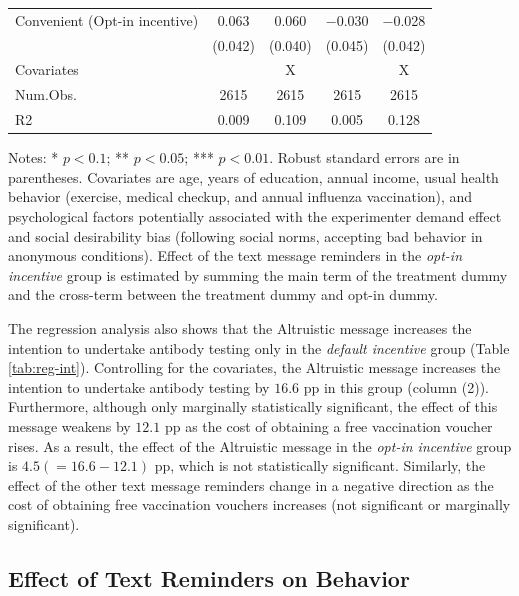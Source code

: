 \documentclass[
      12pt,
    a4paper
]{article}
\begin{document}
\begin{table}
\begin{threeparttable}
\begin{tabular}[t]{lcccc}
\hspace{1em}Convenient (Opt-in incentive) & \num{0.063} & \num{0.060} & \num{-0.030} & \num{-0.028}\\
\hspace{1em} & (\num{0.042}) & (\num{0.040}) & (\num{0.045}) & (\num{0.042})\\
\midrule
Covariates &  & X &  & X\\
Num.Obs. & \num{2615} & \num{2615} & \num{2615} & \num{2615}\\
R2 & \num{0.009} & \num{0.109} & \num{0.005} & \num{0.128}\\
\bottomrule
\end{tabular}
\begin{tablenotes}
\item Notes: * $p < 0.1$; ** $p < 0.05$; *** $p < 0.01$. Robust standard errors are in parentheses. Covariates are age, years of education, annual income, usual health behavior (exercise, medical checkup, and annual influenza vaccination), and psychological factors potentially associated with the experimenter demand effect and social desirability bias (following social norms, accepting bad behavior in anonymous conditions). Effect of the text message reminders in the \emph{opt-in incentive} group is estimated by summing the main term of the treatment dummy and the cross-term between the treatment dummy and opt-in dummy.
\end{tablenotes}
\end{threeparttable}
\end{table}

The regression analysis also shows that the Altruistic message increases the intention to undertake antibody testing only in the \emph{default incentive} group (Table \ref{tab:reg-int}). Controlling for the covariates, the Altruistic message increases the intention to undertake antibody testing by \(16.6\) pp in this group (column (2)). Furthermore, although only marginally statistically significant, the effect of this message weakens by \(12.1\) pp as the cost of obtaining a free vaccination voucher rises. As a result, the effect of the Altruistic message in the \emph{opt-in incentive} group is \(4.5 (=16.6-12.1)\) pp, which is not statistically significant. Similarly, the effect of the other text message reminders change in a negative direction as the cost of obtaining free vaccination vouchers increases (not significant or marginally significant).

\hypertarget{behavior}{%
\subsection{Effect of Text Reminders on Behavior}\label{behavior}}
\end{document}
